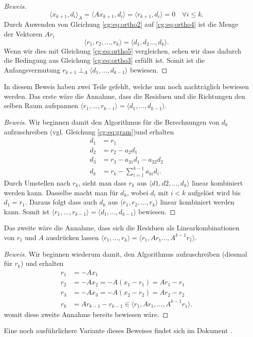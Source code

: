 \begin{proof}[Beweis]
\begin{equation}\label{cg:eq:ortho5}
	\langle x_{k+1}, d_i \rangle_A = \langle Ax_{k+1}, d_i \rangle = \langle r_{k+1}, d_i \rangle = 0 \quad \forall i \le k.
\end{equation}
Durch Anwenden von Gleichung \ref{cg:eq:ortho2} auf \ref{cg:eq:ortho4} ist die Menge der Vektoren $Ar_i$
\begin{equation}
	\langle r_1, r_2, \dots , r_k \rangle = \langle d_1, d_2 \dots ,d_k \rangle.
\end{equation} 
Wenn wir dies mit Gleichung \ref{cg:eq:ortho5} vergleichen, sehen wir dass dadurch die Bedingung aus Gleichung \ref{cg:eq:ortho3} erfüllt ist.
Somit ist die Anfangsvermutung $r_{k+1} \perp_A \langle d_1, \dots ,d_{k-1} \rangle$ bewiesen.
\end{proof}

In diesem Beweis haben zwei Teile gefehlt, welche nun noch nachträglich bewiesen werden.
Das erste wäre die Annahme, dass die Residuen und die Richtungen den selben Raum aufspannen $\langle r_1, \dots ,r_{k-1} \rangle = \langle d_1, \dots ,d_{k-1} \rangle$.

\begin{proof}[Beweis]
Wir beginnen damit den Algorithmus für die Berechnungen von $d_k$ aufzuschreiben (vgl. Gleichung \ref{cg:eq:gram})und erhalten
\begin{align}
	d_1 &= r_1 \nonumber\\
	d_2	&= r_2 - a_2 d_1\nonumber\\
	d_3	&= r_3 - a_{31} d_1 - a_{32} d_2\nonumber\\
	d_k &= r_k - \sum_{i=1}^{k-1} a_{ki} d_i.
\end{align}
Durch Umstellen nach $r_k$, sieht man dass $r_k$ aus $\langle d1, d2, \dots, d_k \rangle$ linear kombiniert werden kann.
Dasselbe macht man für $d_k$, wobei $d_i$ mit $i<k$ aufgelöst wird bis $d_1 = r_1$.
Daraus folgt dass auch $d_k$ aus $\langle r_1, r_2, \dots, r_k \rangle$ linear kombiniert werden kann.
Somit ist $\langle r_1, \dots ,r_{k-1} \rangle = \langle d_1, \dots ,d_{k-1} \rangle$ bewiesen.
\end{proof}

Das zweite wäre die Annahme, dass sich die Residuen als Linearkombinationen von $r_1$ und $A$ ausdrücken lassen $\langle r_1, \dots ,r_k \rangle = \langle r_1, Ar_1 \dots ,A^{k-1}r_1 \rangle$.

\begin{proof}[Beweis]
Wir beginnen wiederum damit, den Algorithmus aufzuschreiben (diesmal für $r_k$) und erhalten
\begin{align}
	r_1 &= -Ax_1 \\
	r_2	&= -Ax_2 = -A(x_1-r_1) = Ar_1 - r_1 \nonumber\\
	r_3 &= -Ax_3 = -A(x_2-r_2) = Ar_2 - r_2 \nonumber\\
	r_k &= Ar_{k-1} - r_{k-1} \in \langle r_1, Ar_1, \dots, A^{k-1}r_1 \rangle.
\end{align}
womit diese zweite Annahme bereits bewiesen wäre.
\end{proof}

Eine noch ausführlichere Variante dieses Beweises findet sich im Dokument \cite{cg:online:cgmueller}.

	
